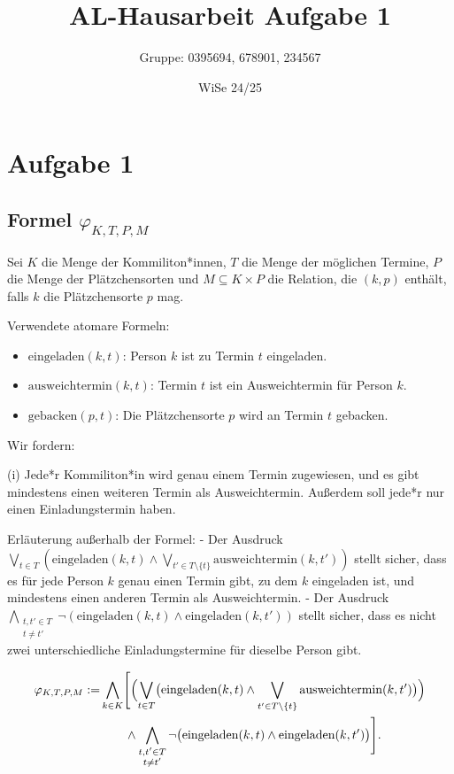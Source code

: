 \documentclass[12pt,a4paper]{article}
\title{AL-Hausarbeit Aufgabe 1}
\author{Gruppe: 0395694, 678901, 234567}
\date{WiSe 24/25}
\begin{document}
\maketitle

\section*{Aufgabe 1}

\subsection*{Formel $\varphi_{K,T,P,M}$}

Sei $K$ die Menge der Kommiliton*innen, $T$ die Menge der möglichen Termine, 
$P$ die Menge der Plätzchensorten und $M \subseteq K \times P$ die Relation, 
die $(k,p)$ enthält, falls $k$ die Plätzchensorte $p$ mag.

Verwendete atomare Formeln:
\begin{itemize}
    \item $\text{eingeladen}(k,t)$: Person $k$ ist zu Termin $t$ eingeladen.
    \item $\text{ausweichtermin}(k,t)$: Termin $t$ ist ein Ausweichtermin für Person $k$.
    \item $\text{gebacken}(p,t)$: Die Plätzchensorte $p$ wird an Termin $t$ gebacken.
\end{itemize}

Wir fordern:

(i) Jede*r Kommiliton*in wird genau einem Termin zugewiesen, und es gibt mindestens einen weiteren Termin als Ausweichtermin. Außerdem soll jede*r nur einen Einladungstermin haben.

Erläuterung außerhalb der Formel:  
- Der Ausdruck $\bigvee_{t \in T}(\text{eingeladen}(k,t) \wedge \bigvee_{t' \in T\setminus\{t\}}\text{ausweichtermin}(k,t'))$ stellt sicher, dass es für jede Person $k$ genau einen Termin gibt, zu dem $k$ eingeladen ist, und mindestens einen anderen Termin als Ausweichtermin.  
- Der Ausdruck $\bigwedge_{\substack{t,t' \in T \\ t \neq t'}} \neg(\text{eingeladen}(k,t)\wedge\text{eingeladen}(k,t'))$ stellt sicher, dass es nicht zwei unterschiedliche Einladungstermine für dieselbe Person gibt.

\begin{align*}
\varphi_{K,T,P,M} := 
& \bigwedge_{k \in K}\Biggl[
   \Bigl(
     \bigvee_{t \in T}\bigl(\text{eingeladen}(k,t) \wedge \bigvee_{t' \in T\setminus\{t\}} \text{ausweichtermin}(k,t')\bigr)
   \Bigr) \\
& \qquad\wedge
   \bigwedge_{\substack{t,t' \in T \\ t \neq t'}} 
     \neg\bigl(\text{eingeladen}(k,t)\wedge \text{eingeladen}(k,t')\bigr)
\Biggr].
\end{align*}
\end{document}
